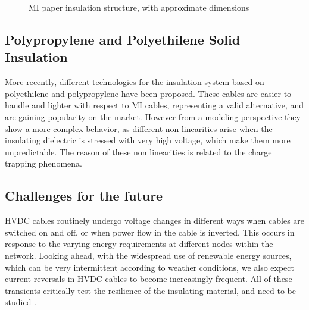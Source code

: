 \documentclass[11pt,a4paper]{article}
\begin{document}
\begin{figure}
\caption{MI paper insulation structure, with approximate dimensions}
\end{figure}
\subsection{Polypropylene and Polyethilene Solid Insulation}
More recently, different technologies for the insulation system based on polyethilene and polypropylene have been proposed. These cables are easier to handle and lighter with respect to MI cables, representing a valid alternative, and are gaining popularity on the market. However from a modeling perspective they show a more complex behavior, as different non-linearities arise when the insulating dielectric is stressed with very high voltage, which make them more unpredictable. The reason of these non linearities is related to the charge trapping phenomena.
\subsection{Challenges for the future}
HVDC cables routinely undergo voltage changes in different ways when cables are switched on and off, or when power flow in the cable is inverted. This occurs in response to the varying energy requirements at different nodes within the network. Looking ahead, with the widespread use of renewable energy sources, which can be very intermittent according to weather conditions, we also expect current reversals in HVDC cables to become increasingly frequent. All of these transients critically test the resilience of the insulating material, and need to be studied \cite{hakonseththesis}.
\end{document}
